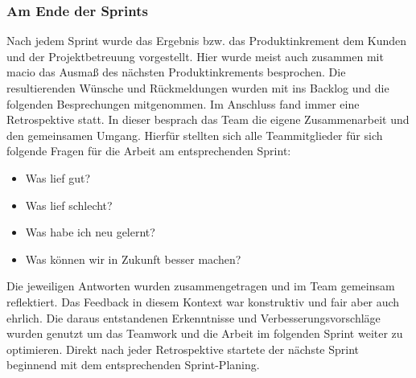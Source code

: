 \documentclass[10pt, a4paper]{article}
\begin{document}
\subsubsection{Am Ende der Sprints}
Nach jedem Sprint wurde das Ergebnis bzw. das Produktinkrement dem Kunden und der Projektbetreuung vorgestellt.
Hier wurde meist auch zusammen mit macio das Ausmaß des nächsten Produktinkrements besprochen.
Die resultierenden Wünsche und Rückmeldungen wurden mit ins Backlog und die folgenden Besprechungen mitgenommen.
Im Anschluss fand immer eine Retrospektive statt.
In dieser besprach das Team die eigene Zusammenarbeit und den gemeinsamen Umgang.
Hierfür stellten sich alle Teammitglieder für sich folgende Fragen für die Arbeit am entsprechenden Sprint:
\begin{itemize}[noitemsep,topsep=0pt,parsep=0pt,partopsep=0pt]
  \item Was lief gut?
  \item Was lief schlecht?
  \item Was habe ich neu gelernt?
  \item Was können wir in Zukunft besser machen?
\end{itemize}
Die jeweiligen Antworten wurden zusammengetragen und im Team gemeinsam reflektiert.
Das Feedback in diesem Kontext war konstruktiv und fair aber auch ehrlich.
Die daraus entstandenen Erkenntnisse und Verbesserungsvorschläge wurden genutzt um das Teamwork und die Arbeit im folgenden Sprint weiter zu optimieren.
Direkt nach jeder Retrospektive startete der nächste Sprint beginnend mit dem entsprechenden Sprint-Planing.
\end{document}
